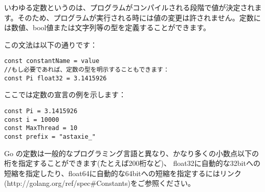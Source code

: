 いわゆる定数というのは、プログラムがコンパイルされる段階で値が決定されます。そのため、プログラムが実行される時には値の変更は許されません。定数には数値、bool値または文字列等の型を定義することができます。

この文法は以下の通りです：

\begin{lstlisting}[numbers=none]
const constantName = value
//もし必要であれば、定数の型を明示することもできます：
const Pi float32 = 3.1415926
\end{lstlisting}

ここでは定数の宣言の例を示します：

\begin{lstlisting}[numbers=none]
const Pi = 3.1415926
const i = 10000
const MaxThread = 10
const prefix = "astaxie_"
\end{lstlisting}

Go の定数は一般的なプログラミング言語と異なり、かなり多くの小数点以下の桁を指定することができます(たとえば200桁など)、 float32に自動的な32bitへの短縮を指定したり、float64に自動的な64bitへの短縮を指定するにはリンク(http:\//\//golang.org\//ref\//spec\#Constants)をご参照ください。
